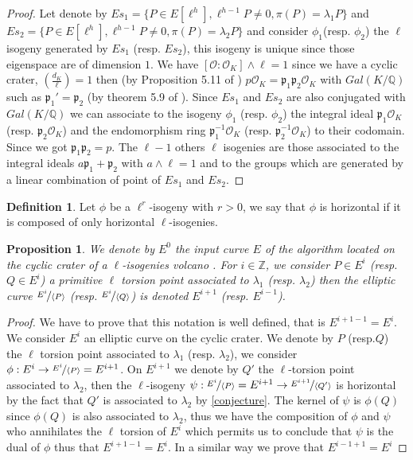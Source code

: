\documentclass{article}
\theoremstyle{plain}
\newtheorem{prop}[thm]{Proposition}
\theoremstyle{definition}
\newtheorem{defi}[thm]{Definition}
\theoremstyle{remark}
\begin{document}
\begin{proof}
Let denote by $Es_1=\{P \in E[\ell^h], \ell^{h-1}P \neq 0, \pi(P)=\lambda_1P\}$ and $Es_2=\{P \in E[\ell^h], \ell^{h-1}P \neq 0, \pi(P)=\lambda_2P\}$ and consider $\phi_1$(resp. $\phi_2$) the $\ell$isogeny generated by $Es_1$ (resp. $Es_2$), this isogeny is unique since those eigenspace are of dimension $1$. We have $[\mathcal{O}:\mathcal{O}_K]\wedge \ell =1$ since we have a cyclic crater, $\left( \frac{d_K}{\ell} \right)=1$ then (by Proposition 5.11 of \cite{Cox89} )  $p\mathcal{O}_K=\mathfrak{p}_1\mathfrak{p}_2\mathcal{O}_K$ with $Gal(K/\mathbb{Q})$ such as $\mathfrak{p}_1'=\mathfrak{p}_2$ (by theorem 5.9 of \cite{Cox89}). Since $Es_1$ and $Es_2$ are also conjugated with $Gal(K/\mathbb{Q})$ we can associate to the isogeny $\phi_1$ (resp. $\phi_2$)  the integral ideal $\mathfrak{p}_1\mathcal{O}_K$ (resp. $\mathfrak{p}_2\mathcal{O}_K$) and the endomorphism ring $\mathfrak{p}_1^{-1}\mathcal{O}_K$ (resp. $\mathfrak{p}_2^{-1}\mathcal{O}_K$) to their codomain. Since we got $\mathfrak{p}_1\mathfrak{p}_2=p$. The $\ell - 1$ others $\ell$ isogenies are those associated to the integral ideals $a  \mathfrak{p}_1 + \mathfrak{p}_2$ with $a \wedge \ell =1$ and to the groups which are generated by a linear combination of point of $Es_1$ and $Es_2$.
\end{proof}

\begin{defi}
Let $\phi$ be a $\ell^r$-isogeny with $r>0$, we say that $\phi$ is horizontal if it is composed of only horizontal $\ell$-isogenies.
\end{defi}

\begin{prop}
We denote by $E^0$ the input curve $E$ of the algorithm located on the cyclic crater of a $\ell$-isogenies volcano . For $i \in \mathbb{Z}$, we consider $P \in E^i$ (resp. $Q \in E^i$) a primitive $\ell$ torsion point associated to $\lambda_1$ (resp. $\lambda_2$) then the elliptic curve $\nicefrac{E^i}{\langle P \rangle }$ (resp. $\nicefrac{E^i}{\langle Q \rangle }$) is denoted $E^{i+1}$ (resp. $E^{i-1}$).
\end{prop}

\begin{proof}
We have to prove that this notation is well defined, that is $E^{i+1-1}=E^{i}$. We consider $E^i$ an elliptic curve on the cyclic crater. We denote by $P$ (resp.$Q$) the $\ell$ torsion point associated to $\lambda_1$ (resp. $\lambda_2$), we consider $\phi: E^i\rightarrow \nicefrac{E^i}{\langle P \rangle}=E^{i+1}$. On $E^{i+1}$ we denote by $Q'$ the $\ell$-torsion point associated to $\lambda_2$, then the $\ell$-isogeny $\psi: \nicefrac{E^i}{\langle P \rangle}=E^{i+1}\rightarrow \nicefrac{E^{i+1}}{\langle Q' \rangle}$ is horizontal by the fact that $Q'$ is associated to $\lambda_2$ by \ref{conjecture}. The kernel of $\psi$ is $\phi(Q)$ since $\phi(Q)$ is also associated to $\lambda_2$, thus we have the composition of $\phi$ and $\psi$ who annihilates the $\ell$ torsion of $E^i$ which permits us to conclude that $\psi$ is the dual of $\phi$ thus that $E^{i+1-1}=E^{i}$. In a similar way we prove that $E^{i-1+1}=E^{i}$
\end{proof}
\end{document}
